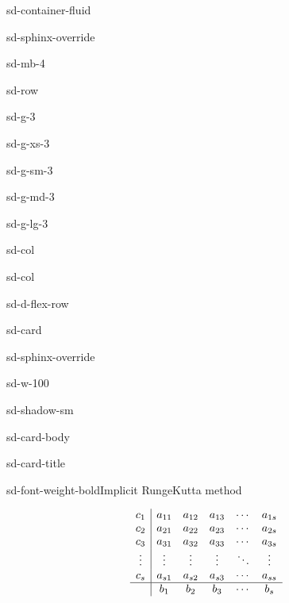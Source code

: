 \documentclass[letterpaper,10pt,english]{jupyterBook}
\begin{document}
\begin{sphinxuseclass}{sd-container-fluid}
\begin{sphinxuseclass}{sd-sphinx-override}
\begin{sphinxuseclass}{sd-mb-4}
\begin{sphinxuseclass}{sd-row}
\begin{sphinxuseclass}{sd-g-3}
\begin{sphinxuseclass}{sd-g-xs-3}
\begin{sphinxuseclass}{sd-g-sm-3}
\begin{sphinxuseclass}{sd-g-md-3}
\begin{sphinxuseclass}{sd-g-lg-3}
\begin{sphinxuseclass}{sd-col}
\end{sphinxuseclass}
\begin{sphinxuseclass}{sd-col}
\begin{sphinxuseclass}{sd-d-flex-row}
\begin{sphinxuseclass}{sd-card}
\begin{sphinxuseclass}{sd-sphinx-override}
\begin{sphinxuseclass}{sd-w-100}
\begin{sphinxuseclass}{sd-shadow-sm}
\begin{sphinxuseclass}{sd-card-body}
\begin{sphinxuseclass}{sd-card-title}
\begin{sphinxuseclass}{sd-font-weight-bold}Implicit Runge\sphinxhyphen{}Kutta method
\end{sphinxuseclass}
\end{sphinxuseclass}\begin{align*}
    \begin{array}{c|ccccc}
        c_1  & a_{11}  & a_{12}  & a_{13}  & \cdots  & a_{1s} \\
        c_2  & a_{21}  & a_{22}  & a_{23}  & \cdots  & a_{2s} \\
        c_3  & a_{31}  & a_{32}  & a_{33}  & \cdots  & a_{3s} \\
        \vdots  & \vdots  & \vdots  & \vdots  & \ddots  & \vdots \\
        c_s  & a_{s1}  & a_{s2}  & a_{s3}  & \cdots  & a_{ss} \\ \hline
         & b_1  & b_2  & b_3  & \cdots  & b_s 
    \end{array}
\end{align*}
\end{sphinxuseclass}
\end{sphinxuseclass}
\end{sphinxuseclass}
\end{sphinxuseclass}
\end{sphinxuseclass}
\end{sphinxuseclass}
\end{sphinxuseclass}
\end{sphinxuseclass}
\end{sphinxuseclass}
\end{sphinxuseclass}
\end{sphinxuseclass}
\end{sphinxuseclass}
\end{sphinxuseclass}
\end{sphinxuseclass}
\end{sphinxuseclass}
\end{sphinxuseclass}
\sphinxstepscope
\end{document}
